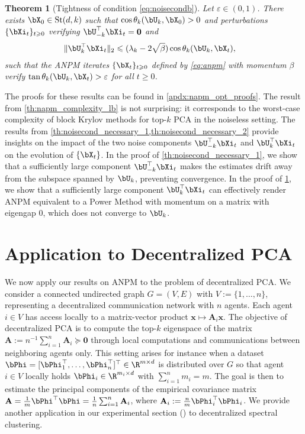 \documentclass{article}
\theoremstyle{plain}
\newtheorem{theorem}{Theorem}[section]
\theoremstyle{definition}
\theoremstyle{remark}
\begin{document}
\begin{theorem}[Tightness of condition \eqref{eq:noisecondb}]\label{th:noisecond_necessary_2}
  Let $\varepsilon \in (0,1)$. There exists $\bX_0 \in \mathrm{St}(d,k)$ such that $\cos\theta_k(\bU_k, \bX_0) > 0$ and perturbations $\{\bXi_t\}_{t\geqslant 0}$ verifying $\bU_{-k}^\top\bXi_t  = \mathbf{0}$ and
  \begin{align*}
    & \Vert \bU_k^\top \bXi_t \Vert_2 \leqslant (\lambda_k - 2\sqrt{\beta}) \cos\theta_k(\bU_k, \bX_t),
  \end{align*}
  such that the ANPM iterates $\{\bX_t\}_{t\geqslant 0}$ defined by \eqref{eq:anpm} with momentum $\beta$ verify $\tan\theta_k(\bU_k, \bX_t) > \varepsilon$ for all $t\geqslant 0$.
\end{theorem}

The proofs for these results can be found in \cref{apdx:napm_opt_proofs}. The result from \cref{th:napm_complexity_lb} is not surprising: it corresponds to the worst-case complexity of block Krylov methods for top-$k$ PCA in the noiseless setting. The results from \cref{th:noisecond_necessary_1,th:noisecond_necessary_2} provide insights on the impact of the two noise components $\bU_{-k}^\top \bXi_t$ and $\bU_k^\top \bXi_t$ on the evolution of $\{\bX_t\}$. In the proof of \cref{th:noisecond_necessary_1}, we show that a sufficiently large component $\bU_{-k}^\top \bXi_t$ makes the estimates drift away from the subspace spanned by $\bU_k$, preventing convergence. In the proof of \cref{th:noisecond_necessary_2}, we show that a sufficiently large component $\bU_k^\top \bXi_t$ can effectively render ANPM equivalent to a Power Method with momentum on a matrix with eigengap $0$, which does not converge to $\bU_k$.

\section{Application to Decentralized PCA}\label{sec:adepm}



We now apply our results on ANPM to the problem of decentralized PCA. We consider a connected undirected graph $G = (V,E)$ with $V := \{1,\dots,n\}$, representing a decentralized communication network with $n$ agents. Each agent $i \in V$ has access locally to a matrix-vector product $\bm{x} \mapsto \mathbf{A}_i \bm{x}$. The objective of decentralized PCA is to compute the top-$k$ eigenspace of the matrix $\mathbf{A}:= n^{-1} \sum_{i=1}^n \mathbf{A}_i \succeq \mathbf{0}$ through local computations and communications between neighboring agents only. This setting arises for instance when a dataset $\bPhi = [\bPhi_1^\top,\dots,\bPhi_n^\top]^\top\in\R^{m\times d}$ is distributed over $G$ so that agent $i\in V$ locally holds $\bPhi_i \in \R^{m_i \times d}$ with $\sum_{i=1}^n m_i = m$. The goal is then to estimate the principal components of the empirical covariance matrix $\mathbf{A} = \frac{1}{m} \bPhi^\top \bPhi = \frac{1}{n} \sum_{i=1}^n \mathbf{A}_i$, where $\mathbf{A}_i := \frac{n}{m} \bPhi_i^\top \bPhi_i$.
We provide another application in our experimental section () to decentralized spectral clustering.
\end{document}
